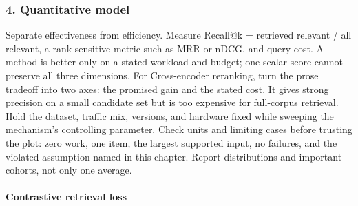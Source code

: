 \subsubsection*{4. Quantitative model}
Separate effectiveness from efficiency. Measure Recall@k = retrieved relevant / all relevant, a rank-sensitive metric such as MRR or nDCG, and query cost. A method is better only on a stated workload and budget; one scalar score cannot preserve all three dimensions.
For Cross-encoder reranking, turn the prose tradeoff into two axes: the promised gain and the stated cost. It gives strong precision on a small candidate set but is too expensive for full-corpus retrieval. Hold the dataset, traffic mix, versions, and hardware fixed while sweeping the mechanism's controlling parameter.
Check units and limiting cases before trusting the plot: zero work, one item, the largest supported input, no failures, and the violated assumption named in this chapter. Report distributions and important cohorts, not only one average.
\paragraph{Contrastive retrieval loss}

